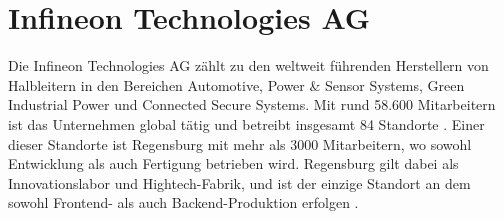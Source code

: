 \section{Infineon Technologies AG}

Die Infineon Technologies AG zählt zu den weltweit führenden Herstellern von Halbleitern in den Bereichen Automotive, Power \& Sensor Systems, Green Industrial Power und Connected Secure Systems. Mit rund 58.600 Mitarbeitern ist das Unternehmen global tätig und betreibt insgesamt 84 Standorte \cite{infineon2024unternehmenspraesentation}. Einer dieser Standorte ist Regensburg mit mehr als 3000 Mitarbeitern, wo sowohl Entwicklung als auch Fertigung betrieben wird. Regensburg gilt dabei als Innovationslabor und Hightech-Fabrik, und ist der einzige Standort an dem sowohl Frontend- als auch Backend-Produktion erfolgen \cite{infineon2024regensburg}.

